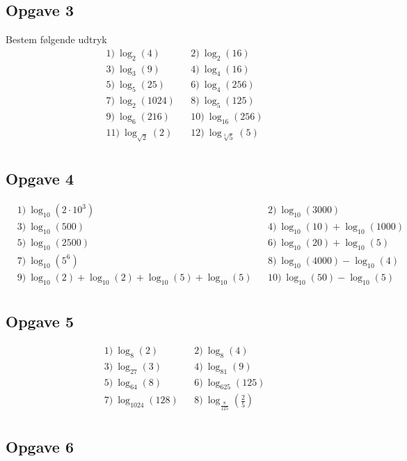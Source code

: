 \subsection*{Opgave 3}
Bestem følgende udtryk
\begin{align*}
	&1) \ \log_2(4) &    &2) \ \log_2(16) \\
	&3) \ \log_3(9) &    &4) \ \log_4(16) \\
	&5) \ \log_5(25) &    &6) \ \log_4(256) \\
	&7) \ \log_2(1024) &    &8) \ \log_5(125) \\
	&9) \ \log_6(216) &    &10) \ \log_{16}(256) \\
	&11) \ \log_{\sqrt{2}}(2) &    &12) \ \log_{\sqrt[3]{5}}(5) \\
\end{align*}

\subsection*{Opgave 4}
\begin{align*}
	&1) \ \log_{10}(2\cdot 10^3) && 2) \ \log_{10}(3000) \\
	&3) \ \log_{10}(500)        && 4) \ \log_{10}(10) + \log_{10}(1000) \\
	&5) \  \log_{10}(2500)  &&6) \ \log_{10}(20)+ \log_{10}(5)   \\   
	&7) \  \log_{10}(5^6)  &&8) \ \log_{10}(4000) - \log_{10}(4)   \\   
	&9) \  \log_{10}(2)+\log_{10}(2)+\log_{10}(5) + \log_{10}(5)  &&10) \ \log_{10}(50)-\log_{10}(5)  \\ 
\end{align*}	

\subsection*{Opgave 5}
\begin{align*}
	&1) \ \log_{8}(2) &  &2) \ \log_{8}(4)\\
	&3) \ \log_{27}(3) & &4) \ \log_{81}(9)\\
	&5) \ \log_{64}(8) & &6) \ \log_{625}(125)\\
	&7) \ \log_{1024}(128) & &8) \ \log_{\frac{8}{125}}\left(\frac{2}{5}\right)\\
\end{align*}

\newpage
\subsection*{Opgave 6}

